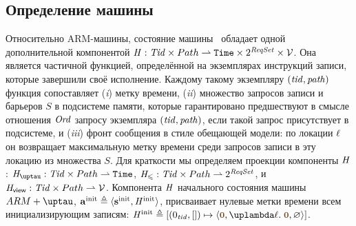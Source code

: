 \subsection{Определение машины \ARMt}
Относительно ARM-машины,
состояние машины \ARMt~обладает одной дополнительной компонентой
$\mathit{H} : \mathit{Tid} \times Path \rightharpoonup \mathtt{Time} \times 2^{\mathit{ReqSet}} \times \mathcal{V}$.
Она является частичной функцией, определённой на экземплярах инструкций
записи, которые завершили своё исполнение.
Каждому такому экземпляру $(\mathit{tid}, \mathit{path})$ функция сопоставляет
(\emph{i}) метку времени,
(\emph{ii}) множество запросов записи и барьеров $S$ в подсистеме памяти,
которые гарантировано предшествуют в смысле отношения $\mathit{Ord}$ запросу экземпляра $(\mathit{tid}, \mathit{path})$,
если такой запрос присутствует в подсистеме,
и (\emph{iii}) фронт сообщения в стиле обещающей модели:
по локации $\ell$ он возвращает максимальную метку времени среди запросов записи
в эту локацию из множества $S$.
Для краткости мы определяем проекции компоненты $\mathit{H}$:
$\tmap: \Tid \times \Path \rightharpoonup \Timestamp$,
$\mathit{H}_{\leqslant}: \mathit{Tid} \times Path \rightharpoonup 2^{\mathit{ReqSet}}$, и
$\mathit{H}_{\mathsf{view}}: \mathit{Tid} \times Path \rightharpoonup \mathcal{V}$.
Компонента $\mathit{H}$ начального состояния машины $\ARMt$,
$\mathbf{a}^{\rm init} \triangleq \langle \mathbf{s}^{\rm init}, \mathit{H}^{\rm init} \rangle$,
присваивает нулевые метки времени всем инициализирующим записям:
$\hmap^{\rm init} \triangleq [(0_{\tId}, []) \mapsto
  \angled{\tstamp{0}, \lambda \loc. \; \tstamp{0}, \emptyset}]$.

